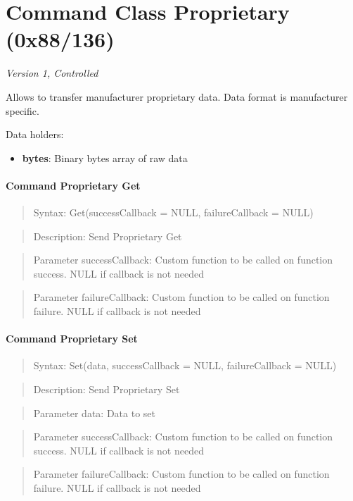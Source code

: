 \section{Command Class Proprietary (0x88/136)}

\textit{Version 1, Controlled}
\newline

Allows to transfer manufacturer proprietary data. Data format is manufacturer specific.
\newline

\noindent
Data holders:

\begin{itemize}
\item \textbf{bytes}: Binary bytes array of raw data
\end{itemize}

\paragraph{Command Proprietary Get}
\begin{quote}Syntax: Get(successCallback = NULL, failureCallback = NULL)\end{quote}
\begin{quote}Description: Send Proprietary Get\end{quote}
\begin{quote}Parameter successCallback: Custom function to be called on function success. NULL if callback is not needed\end{quote}
\begin{quote}Parameter failureCallback: Custom function to be called on function failure. NULL if callback is not needed\end{quote}


\paragraph{Command Proprietary Set}
\begin{quote}Syntax: Set(data, successCallback = NULL, failureCallback = NULL)\end{quote}
\begin{quote}Description: Send Proprietary Set\end{quote}
\begin{quote}Parameter data: Data to set\end{quote}
\begin{quote}Parameter successCallback: Custom function to be called on function success. NULL if callback is not needed\end{quote}
\begin{quote}Parameter failureCallback: Custom function to be called on function failure. NULL if callback is not needed\end{quote}



